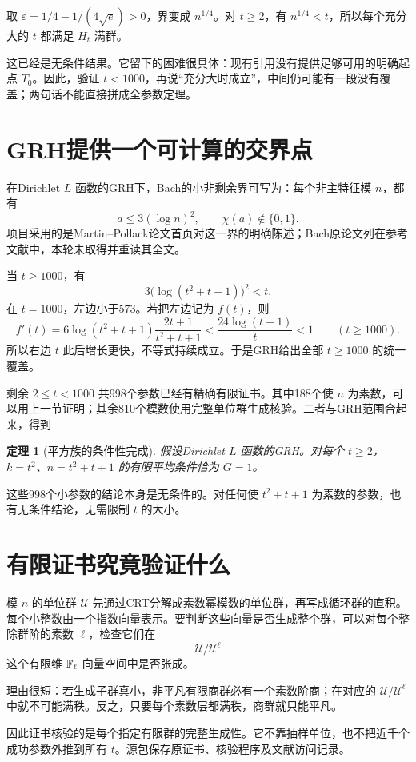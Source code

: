 \documentclass[11pt,a4paper,oneside,openany]{book}
\newtheorem{theorem}{定理}[chapter]
\theoremstyle{definition}\newtheorem{example}[theorem]{例}\newtheorem{conjecture}[theorem]{猜想}
\numberwithin{equation}{chapter}\setcounter{tocdepth}{1}
\begin{document}
取 $\varepsilon=1/4-1/(4\sqrt e)>0$，界变成 $n^{1/4}$。对 $t\ge2$，有 $n^{1/4}<t$，所以每个充分大的 $t$ 都满足 $H_t$ 满群。

这已经是无条件结果。它留下的困难很具体：现有引用没有提供足够可用的明确起点 $T_0$。因此，验证 $t<1000$，再说“充分大时成立”，中间仍可能有一段没有覆盖；两句话不能直接拼成全参数定理。

\section{GRH提供一个可计算的交界点}
在Dirichlet $L$ 函数的GRH下，Bach的小非剩余界可写为：每个非主特征模 $n$，都有
\[a\le3(\log n)^2,\qquad\chi(a)\notin\{0,1\}.
\]
项目采用的是Martin--Pollack论文首页对这一界的明确陈述；Bach原论文列在参考文献中，本轮未取得并重读其全文。\cite{MartinPollack2013,Bach1990}

当 $t\ge1000$，有
\[3\bigl(\log(t^2+t+1)\bigr)^2<t.
\]
在 $t=1000$，左边小于573。若把左边记为 $f(t)$，则
\[f'(t)=6\log(t^2+t+1)\frac{2t+1}{t^2+t+1}
<\frac{24\log(t+1)}t<1\qquad(t\ge1000).
\]
所以右边 $t$ 此后增长更快，不等式持续成立。于是GRH给出全部 $t\ge1000$ 的统一覆盖。

剩余 $2\le t<1000$ 共998个参数已经有精确有限证书。其中188个使 $n$ 为素数，可以用上一节证明；其余810个模数使用完整单位群生成核验。二者与GRH范围合起来，得到
\begin{theorem}[平方族的条件性完成]
假设Dirichlet $L$ 函数的GRH。对每个 $t\ge2$，$k=t^2$、$n=t^2+t+1$ 的有限平均条件恰为 $G=1$。
\end{theorem}
这些998个小参数的结论本身是无条件的。对任何使 $t^2+t+1$ 为素数的参数，也有无条件结论，无需限制 $t$ 的大小。

\section{有限证书究竟验证什么}
模 $n$ 的单位群 $\mathcal U$ 先通过CRT分解成素数幂模数的单位群，再写成循环群的直积。每个小整数由一个指数向量表示。要判断这些向量是否生成整个群，可以对每个整除群阶的素数 $\ell$，检查它们在
\[\mathcal U/\mathcal U^\ell
\]
这个有限维 $\mathbb F_\ell$ 向量空间中是否张成。

理由很短：若生成子群真小，非平凡有限商群必有一个素数阶商；在对应的 $\mathcal U/\mathcal U^\ell$ 中就不可能满秩。反之，只要每个素数层都满秩，商群就只能平凡。

因此证书核验的是每个指定有限群的完整生成性。它不靠抽样单位，也不把近千个成功参数外推到所有 $t$。源包保存原证书、核验程序及文献访问记录。
\end{document}
